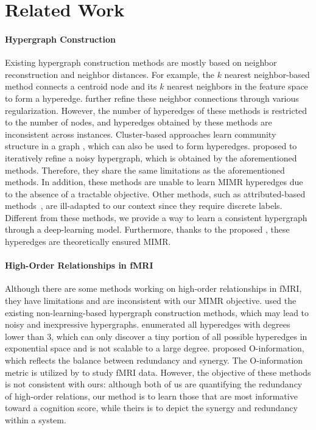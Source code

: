 \section{Related Work}
\paragraph{Hypergraph Construction}
 Existing hypergraph construction methods are mostly based on neighbor reconstruction and neighbor distances. For example, the $k$ nearest neighbor-based method \citep{huang2009video} connects a centroid node and its $k$ nearest neighbors in the feature space to form a hyperedge. \citet{wang2015visual,liu2017elastic,jin2019robust,xiao2019multi} further refine these neighbor connections through various regularization. However, the number of hyperedges of these methods is restricted to the number of nodes, and hyperedges obtained by these methods are inconsistent across instances. 
 Cluster-based approaches learn community structure in a graph \citep{bannadabhavi2023community,ying2018hierarchical}, which can also be used to form hyperedges.
 \citet{zhang2022deep,zhang2018dynamic} proposed to iteratively refine a noisy hypergraph, which is obtained by the aforementioned methods. Therefore, they share the same limitations as the aforementioned methods. In addition, these methods are unable to learn MIMR hyperedges due to the absence of a tractable objective. Other methods, such as attributed-based methods~\citep{huang2015learning, joslyn2019high}, are ill-adapted to our context since they require discrete labels. 
 Different from these methods, we provide a way to learn a consistent hypergraph through a deep-learning model. Furthermore, thanks to the proposed \multiheadname, these hyperedges are theoretically ensured MIMR.

\paragraph{High-Order Relationships in fMRI}

Although there are some methods working on high-order relationships in fMRI, they have limitations and are inconsistent with our MIMR objective.
\citet{xiao2019multi,li2022construction} used the existing non-learning-based hypergraph construction methods, which may lead to noisy and inexpressive hypergraphs. \citet{zu2016identifying,santoro2023higher} enumerated all hyperedges with degrees lower than 3, which can only discover a tiny portion of all possible hyperedges in exponential space and is not scalable to a large degree. \citet{rosas2019quantifying} proposed O-information, which reflects the balance between redundancy and synergy. The O-information metric is utilized by \citet{varley2023multivariate} to study fMRI data. However, the objective of these methods is not consistent with ours: although both of us are quantifying the redundancy of high-order relations, our method is to learn those that are most informative toward a cognition score, while theirs is to depict the synergy and redundancy within a system.

